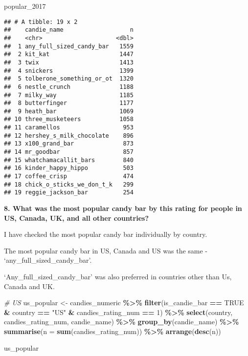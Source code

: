 \documentclass[
]{article}
\newenvironment{Shaded}{\begin{snugshade}}{\end{snugshade}}
\newcommand{\AttributeTok}[1]{\textcolor[rgb]{0.13,0.29,0.53}{#1}}
\newcommand{\CommentTok}[1]{\textcolor[rgb]{0.56,0.35,0.01}{\textit{#1}}}
\newcommand{\ConstantTok}[1]{\textcolor[rgb]{0.56,0.35,0.01}{#1}}
\newcommand{\DecValTok}[1]{\textcolor[rgb]{0.00,0.00,0.81}{#1}}
\newcommand{\FunctionTok}[1]{\textcolor[rgb]{0.13,0.29,0.53}{\textbf{#1}}}
\newcommand{\NormalTok}[1]{#1}
\newcommand{\OtherTok}[1]{\textcolor[rgb]{0.56,0.35,0.01}{#1}}
\newcommand{\SpecialCharTok}[1]{\textcolor[rgb]{0.81,0.36,0.00}{\textbf{#1}}}
\newcommand{\StringTok}[1]{\textcolor[rgb]{0.31,0.60,0.02}{#1}}
\begin{document}
\begin{Shaded}
\begin{Highlighting}[]
\NormalTok{popular\_2017}
\end{Highlighting}
\end{Shaded}

\begin{verbatim}
## # A tibble: 19 x 2
##    candie_name                   n
##    <chr>                     <dbl>
##  1 any_full_sized_candy_bar   1559
##  2 kit_kat                    1447
##  3 twix                       1413
##  4 snickers                   1399
##  5 tolberone_something_or_ot  1320
##  6 nestle_crunch              1188
##  7 milky_way                  1185
##  8 butterfinger               1177
##  9 heath_bar                  1069
## 10 three_musketeers           1058
## 11 caramellos                  953
## 12 hershey_s_milk_chocolate    896
## 13 x100_grand_bar              873
## 14 mr_goodbar                  857
## 15 whatchamacallit_bars        840
## 16 kinder_happy_hippo          503
## 17 coffee_crisp                474
## 18 chick_o_sticks_we_don_t_k   299
## 19 reggie_jackson_bar          254
\end{verbatim}

\textbf{8. What was the most popular candy bar by this rating for people
in US, Canada, UK, and all other countries?}

I have checked the most popular candy bar individually by country.

The most popular candy bar in US, Canada and US was the same -
`any\_full\_sized\_candy\_bar'.

`Any\_full\_sized\_candy\_bar' was also preferred in countries other
than Us, Canada and UK.

\begin{Shaded}
\begin{Highlighting}[]
\CommentTok{\# US}
\NormalTok{us\_popular }\OtherTok{\textless{}{-}}\NormalTok{ candies\_numeric }\SpecialCharTok{\%\textgreater{}\%}
  \FunctionTok{filter}\NormalTok{(is\_candie\_bar }\SpecialCharTok{==} \ConstantTok{TRUE} \SpecialCharTok{\&}\NormalTok{ country }\SpecialCharTok{==} \StringTok{"US"} \SpecialCharTok{\&}\NormalTok{ candies\_rating\_num }\SpecialCharTok{==} \DecValTok{1}\NormalTok{) }\SpecialCharTok{\%\textgreater{}\%}
  \FunctionTok{select}\NormalTok{(country, candies\_rating\_num, candie\_name) }\SpecialCharTok{\%\textgreater{}\%}
  \FunctionTok{group\_by}\NormalTok{(candie\_name) }\SpecialCharTok{\%\textgreater{}\%} 
  \FunctionTok{summarise}\NormalTok{(}\AttributeTok{n =} \FunctionTok{sum}\NormalTok{(candies\_rating\_num)) }\SpecialCharTok{\%\textgreater{}\%} 
  \FunctionTok{arrange}\NormalTok{(}\FunctionTok{desc}\NormalTok{(n))}

\NormalTok{us\_popular}
\end{Highlighting}
\end{Shaded}
\end{document}
